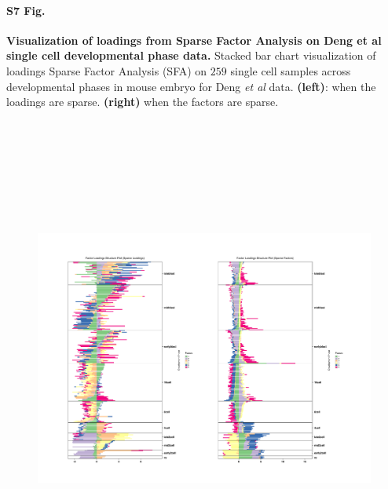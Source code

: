 \documentclass[10pt,letterpaper]{article}
\begin{document}
\paragraph*{S7 Fig.}

\label{figS7}
{\bf Visualization of loadings from Sparse Factor Analysis on Deng et al single cell developmental phase data.} Stacked bar chart visualization of loadings Sparse Factor Analysis (SFA) on $259$ single cell samples
across developmental phases in mouse embryo for Deng \textit{et al} data. \textbf{(left)}: when the loadings are sparse. \textbf{(right)} when the factors are sparse.
\begin{figure}[ht]
\centering
\includegraphics[height=6.3in, width=7in]{../../plots/deng-figures/sfa_deng_figs.pdf}
\end{figure}
\end{document}
